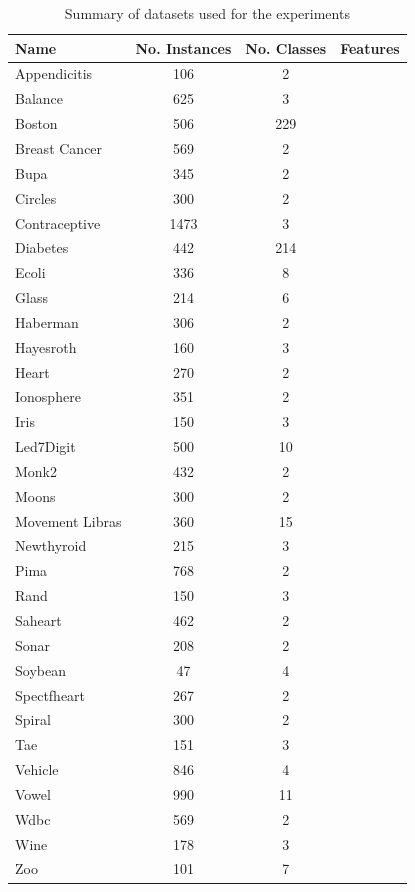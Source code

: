 \documentclass[review]{elsarticle}
\begin{document}
\begin{table}[!h]
	\centering
	\small
	\begin{tabular}{l c c c}
		\hline
		Name & No. Instances & No. Classes & Features \\
		\hline
		Appendicitis & 106 & 2 &  \\
		Balance & 625 & 3 &  \\
		Boston & 506 & 229 &  \\
		Breast Cancer & 569 & 2 &  \\
		Bupa & 345 & 2 &  \\
		Circles & 300 & 2 &  \\
		Contraceptive & 1473 & 3 &  \\
		Diabetes & 442 & 214 &  \\
		Ecoli & 336 & 8 &  \\
		Glass & 214 & 6 &  \\
		Haberman & 306 & 2 &  \\
		Hayesroth & 160 & 3 &  \\
		Heart & 270 & 2 &  \\
		Ionosphere & 351 & 2 &  \\
		Iris & 150 & 3 &  \\
		Led7Digit & 500 & 10 &  \\
		Monk2 & 432 & 2 &  \\
		Moons & 300 & 2 &  \\
		Movement Libras & 360 & 15 &  \\
		Newthyroid & 215 & 3 &  \\
		Pima & 768 & 2 &  \\
		Rand & 150 & 3 &  \\
		Saheart & 462 & 2 &  \\
		Sonar & 208 & 2 &  \\
		Soybean & 47 & 4 &  \\
		Spectfheart & 267 & 2 &  \\
		Spiral & 300 & 2 &  \\
		Tae & 151 & 3 &  \\
		Vehicle & 846 & 4 &  \\
		Vowel & 990 & 11 &  \\
		Wdbc & 569 & 2 &  \\
		Wine & 178 & 3 &  \\
		Zoo & 101 & 7 &  \\
		\hline

	\end{tabular}%
	\caption{Summary of datasets used for the experiments \cite{triguero2017keel}\cite{scikit-learn}}
	\label{tab:datasets}
\end{table}
\end{document}
